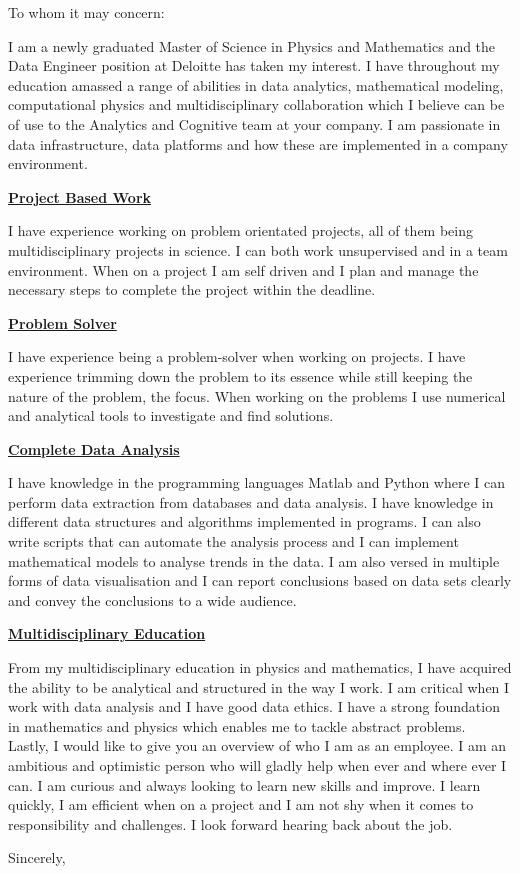 \documentclass[10pt,a4paper]{letter}
\begin{document}
\begin{letter}{}
\opening{To whom it may concern:}
I am a newly graduated Master of Science in Physics and Mathematics and the Data Engineer position at Deloitte has taken my interest. I have throughout my education amassed a range of abilities in data analytics, mathematical modeling, computational physics and multidisciplinary collaboration which I believe can be of use to the Analytics and Cognitive team at your company.  
I am passionate in data infrastructure, data platforms and how these are implemented in a company environment. 

\underline{\textbf{Project Based Work}}

I have experience working on problem orientated projects, all of them being multidisciplinary projects in science. I can both work unsupervised and in a team environment. When on a project I am self driven and I plan and manage the necessary steps to complete the project within the deadline.     

 
\underline{\textbf{Problem Solver}}

I have experience being a problem-solver when working on projects. I have experience trimming down the problem to its essence while still keeping the nature of the problem, the focus. When working on the problems I use numerical and analytical tools to investigate and find solutions.   


\underline{\textbf{Complete Data Analysis}}

I have knowledge in the programming languages Matlab and Python where I can perform data extraction from databases and data analysis. I have knowledge in different data structures and algorithms implemented in programs. I can also write scripts that can automate the analysis process and I can implement mathematical models to analyse trends in the data. I am also versed in multiple forms of data visualisation and I can report conclusions based on data sets clearly and convey the conclusions to a wide audience. 


\underline{\textbf{Multidisciplinary Education}}

From my multidisciplinary education in physics and mathematics, I have acquired the ability to be analytical and structured in the way I work. I am critical when I work with data analysis and I have good data ethics. I have a strong foundation in mathematics and physics which enables me to tackle abstract problems.
\\

Lastly, I would like to give you an overview of who I am as an employee. I am an ambitious and optimistic person who will gladly help when ever and where ever I can. I am curious and always looking to learn new skills and improve. I learn quickly, I am efficient when on a project and I am not shy when it comes to responsibility and challenges. I look forward hearing back about the job.   
   



   

\closing{Sincerely,}

\end{letter}
\end{document}
